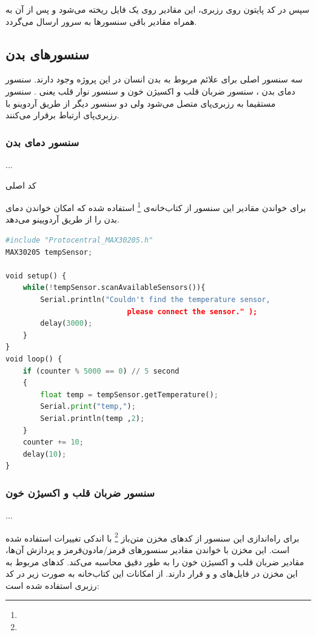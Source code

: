 سپس در کد پایتون روی رزبری، این مقادیر روی یک فایل ریخته می‌شود و پس از آن به همراه مقادیر باقی سنسورها به سرور ارسال می‌گردد.

\subsection{سنسورهای بدن}

سه سنسور اصلی برای علائم مربوط به بدن انسان در این پروژه وجود دارند. سنسور دمای بدن ، سنسور  ضربان قلب و اکسیژن خون  و سنسور نوار قلب یعنی . سنسور  مستقیما به رزبری‌پای متصل می‌شود ولی دو سنسور دیگر از طریق آردوینو با رزبری‌پای ارتباط برقرار می‌کنند.


\subsubsection{سنسور دمای بدن}

...

کد اصلی



برای خواندن مقادیر این سنسور از کتاب‌خانه‌ی
\footnote{}
 استفاده شده که امکان خواندن دمای بدن را از طریق آردویینو می‌دهد.

\begin{latin}
	\begin{lstlisting}[language=python]
#include "Protocentral_MAX30205.h"
MAX30205 tempSensor;

void setup() {
	while(!tempSensor.scanAvailableSensors()){
		Serial.println("Couldn't find the temperature sensor, 
							please connect the sensor." );
		delay(3000);
	}
}
void loop() {	
	if (counter % 5000 == 0) // 5 second
	{
		float temp = tempSensor.getTemperature(); 
		Serial.print("temp,");
		Serial.println(temp ,2);
	}
	counter += 10;
	delay(10);
}
	\end{lstlisting}
\end{latin}



\subsubsection{سنسور ضربان قلب و اکسیژن خون}

...

برای راه‌اندازی این سنسور از کدهای مخزن ‌متن‌باز 
\footnote{}
با اندکی تغییرات
 استفاده شده است. این مخزن با خواندن مقادیر سنسورهای قرمز/مادون‌قرمز و پردازش آن‌ها، مقادیر ضربان قلب و اکسیژن خون را به طور دقیق محاسبه می‌کند. کدهای مربوط به این مخزن در فایل‌های 
 و
 و 
 قرار دارند.
از امکانات این کتاب‌خانه به صورت زیر در کد رزبری استفاده شده است:

